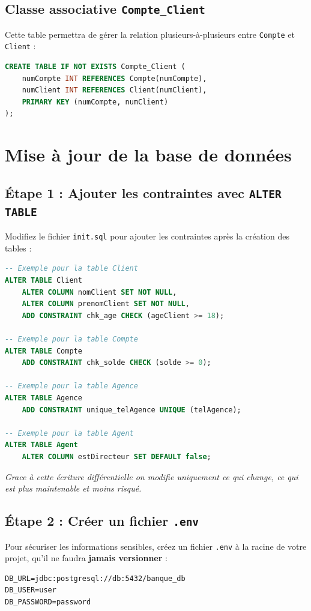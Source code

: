 \documentclass[11pt]{article}
\begin{document}
\subsection{Classe associative \texttt{Compte\_Client}}
Cette table permettra de gérer la relation plusieurs-à-plusieurs entre \texttt{Compte} et \texttt{Client} :
\begin{lstlisting}[language=SQL,breaklines=true]
CREATE TABLE IF NOT EXISTS Compte_Client (
    numCompte INT REFERENCES Compte(numCompte),
    numClient INT REFERENCES Client(numClient),
    PRIMARY KEY (numCompte, numClient)
);
\end{lstlisting}

\section{Mise à jour de la base de données}
\subsection{Étape 1 : Ajouter les contraintes avec \texttt{ALTER TABLE}}
Modifiez le fichier \texttt{init.sql} pour ajouter les contraintes après la création des tables :
\begin{lstlisting}[language=SQL,breaklines=true]
-- Exemple pour la table Client
ALTER TABLE Client
    ALTER COLUMN nomClient SET NOT NULL,
    ALTER COLUMN prenomClient SET NOT NULL,
    ADD CONSTRAINT chk_age CHECK (ageClient >= 18);

-- Exemple pour la table Compte
ALTER TABLE Compte
    ADD CONSTRAINT chk_solde CHECK (solde >= 0);

-- Exemple pour la table Agence
ALTER TABLE Agence
    ADD CONSTRAINT unique_telAgence UNIQUE (telAgence);

-- Exemple pour la table Agent
ALTER TABLE Agent
    ALTER COLUMN estDirecteur SET DEFAULT false;
\end{lstlisting}
\textit{Grace à cette écriture différentielle on modifie uniquement ce qui change, ce qui est plus maintenable et moins risqué.}

\subsection{Étape 2 : Créer un fichier \texttt{.env}}
Pour sécuriser les informations sensibles, créez un fichier \texttt{.env} à la racine de votre projet, qu'il ne faudra \textbf{jamais versionner} :
\begin{lstlisting}
DB_URL=jdbc:postgresql://db:5432/banque_db
DB_USER=user
DB_PASSWORD=password
\end{lstlisting}
\end{document}
